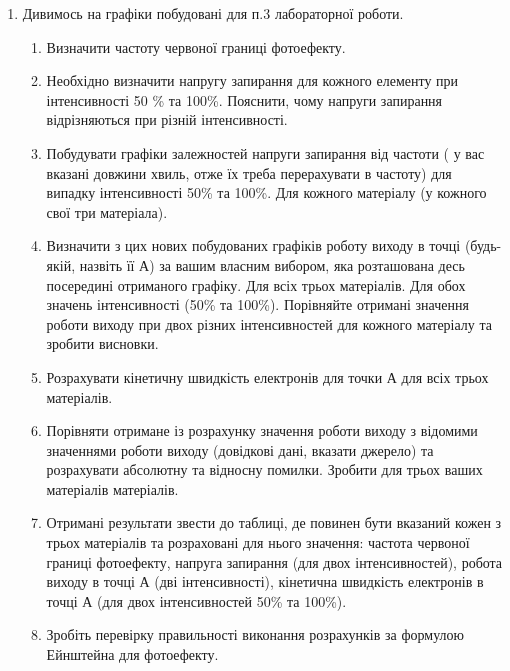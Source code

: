 \documentclass[a4paper,14pt]{extreport}
\begin{document}
\begin{center}\textbf{}\end{center}\par
	\begin{enumerate}
		\item 	Дивимось на графіки побудовані для п.3 лабораторної роботи.
		\begin{enumerate}[label=1.\arabic*]
			\item Визначити частоту червоної границі фотоефекту.
			\item Необхідно визначити напругу запирання для кожного елементу при інтенсивності 50 \% та 100\%.  Пояснити, чому напруги запирання відрізняються при різній інтенсивності.
			\item  Побудувати графіки залежностей напруги запирання від частоти ( у вас вказані довжини хвиль, отже їх треба перерахувати в частоту) для випадку інтенсивності 50\% та 100\%.  Для кожного матеріалу (у кожного свої три матеріала).
			\item Визначити з цих нових побудованих графіків роботу виходу в точці (будь-якій, назвіть її А) за вашим власним вибором, яка розташована десь посередині отриманого графіку. Для всіх трьох матеріалів. Для обох значень інтенсивності (50\% та 100\%). Порівняйте отримані значення роботи виходу при двох різних інтенсивностей для кожного матеріалу та зробити висновки.
			\item  Розрахувати кінетичну швидкість електронів для точки А для всіх трьох матеріалів.
			\item  Порівняти отримане із розрахунку значення роботи виходу з відомими значеннями роботи виходу (довідкові дані, вказати джерело) та розрахувати абсолютну та відносну помилки. Зробити для трьох ваших матеріалів матеріалів.
			\item  Отримані результати звести до таблиці, де повинен бути вказаний кожен з трьох матеріалів та розраховані для нього значення: частота червоної границі фотоефекту, напруга запирання (для двох інтенсивностей), робота виходу в точці А (дві інтенсивності), кінетична швидкість електронів в точці А (для двох інтенсивностей 50\% та 100\%).
			\item Зробіть перевірку правильності виконання розрахунків за формулою Ейнштейна для фотоефекту.
		\end{enumerate}


\end{enumerate}
\end{document}
